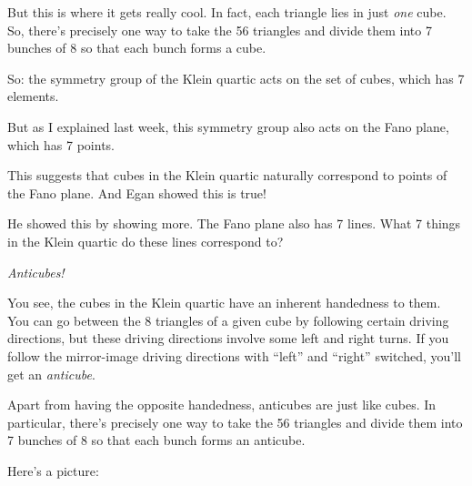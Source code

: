 \documentclass{article}
\def\tightlist{}
\renewcommand{\texttt}[1]{%
  \begingroup
  \ttfamily
  \begingroup\lccode`~=`/\lowercase{\endgroup\def~}{/\discretionary{}{}{}}%
  \begingroup\lccode`~=`[\lowercase{\endgroup\def~}{[\discretionary{}{}{}}%
  \begingroup\lccode`~=`.\lowercase{\endgroup\def~}{.\discretionary{}{}{}}%
  \catcode`/=\active\catcode`[=\active\catcode`.=\active
  \scantokens{#1\noexpand}%
  \endgroup
}
\begin{document}
But this is where it gets really cool. In fact, each triangle lies in
just \emph{one} cube. So, there's precisely one way to take the 56
triangles and divide them into 7 bunches of 8 so that each bunch forms a
cube.

So: the symmetry group of the Klein quartic acts on the set of cubes,
which has 7 elements.

But as I explained last week, this symmetry group also acts on the Fano
plane, which has 7 points.

This suggests that cubes in the Klein quartic naturally correspond to
points of the Fano plane. And Egan showed this is true!

He showed this by showing more. The Fano plane also has 7 lines. What 7
things in the Klein quartic do these lines correspond to?

\emph{Anticubes!}

You see, the cubes in the Klein quartic have an inherent handedness to
them. You can go between the 8 triangles of a given cube by following
certain driving directions, but these driving directions involve some
left and right turns. If you follow the mirror-image driving directions
with ``left'' and ``right'' switched, you'll get an \emph{anticube}.

Apart from having the opposite handedness, anticubes are just like
cubes. In particular, there's precisely one way to take the 56 triangles
and divide them into 7 bunches of 8 so that each bunch forms an
anticube.

Here's a picture:

\end{document}
